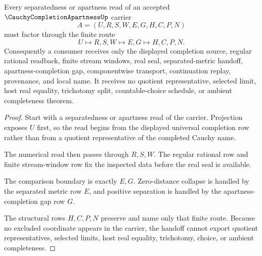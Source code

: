 \begin{theorem}
\label{thm:cauchy-completion-apartness-separatedness-handoff}
Every separatedness or apartness read of an accepted $\CauchyCompletionApartnessUp$ carrier
$$
A=(U,R,S,W,E,G,H,C,P,N)
$$
must factor through the finite route
$$
U \longmapsto R,S,W \longmapsto E,G \longmapsto H,C,P,N .
$$
Consequently a consumer receives only the displayed completion source, regular rational readback, finite stream windows, real seal, separated-metric handoff, apartness-completion gap, componentwise transport, continuation replay, provenance, and local name. It receives no quotient representative, selected limit, host real equality, trichotomy split, countable-choice schedule, or ambient completeness theorem.
\end{theorem}
\begin{proof}
Start with a separatedness or apartness read of the carrier. Projection exposes $U$ first, so the read begins from the displayed universal completion row rather than from a quotient representative of the completed Cauchy name.

The numerical read then passes through $R,S,W$. The regular rational row and finite stream-window row fix the inspected data before the real seal is available.

The comparison boundary is exactly $E,G$. Zero-distance collapse is handled by the separated metric row $E$, and positive separation is handled by the apartness-completion gap row $G$.

The structural rows $H,C,P,N$ preserve and name only that finite route. Because no excluded coordinate appears in the carrier, the handoff cannot export quotient representatives, selected limits, host real equality, trichotomy, choice, or ambient completeness.
\end{proof}


